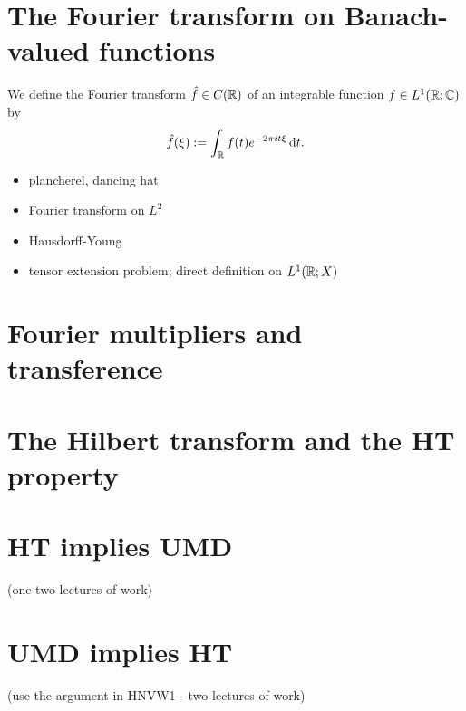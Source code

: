 
\section{The Fourier transform on Banach-valued functions}

We define the Fourier transform $\hat{f} \in C(\mathbb{R})$ of an integrable function $f \in L^1(\mathbb{R};\mathbb{C})$ by
\begin{equation*}
  \hat{f}(\xi) := \int_{\mathbb{R}} f(t) e^{-2\pi i t \xi} \, \mathrm{d} t.
\end{equation*}

\begin{itemize}
  \item plancherel, dancing hat
  \item Fourier transform on $L^2$
  \item Hausdorff-Young
  \item tensor extension problem; direct definition on $L^1(\mathbb{R};X)$
\end{itemize}

\section{Fourier multipliers and transference}

\section{The Hilbert transform and the HT property}

\section{HT implies UMD}

(one-two lectures of work)

\section{UMD implies HT}

(use the argument in HNVW1 - two lectures of work)



